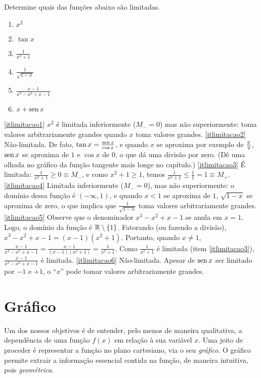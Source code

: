 \begin{exo}
Determine quais das funções abaixo são limitadas.
\begin{multicols}{3}
\begin{enumerate}
\item\label{itlimitacao1} $x^2$
 \item\label{itlimitacao2} $\tan x$
\item\label{itlimitacao3} $\frac{1}{x^2+1}$
\item\label{itlimitacao4} $\frac{1}{\sqrt{1-x}}$
\item\label{itlimitacao5} $\frac{x-1}{x^3-x^2+x-1}$
\item\label{itlimitacao6} $x+\operatorname{sen} x$
\end{enumerate}
\end{multicols}
\vspace{0.01cm}
\begin{sol}
\eqref{itlimitacao1} $x^2$ é limitada inferiormente ($M_-=0$) mas não
superiormente: toma valores arbitrariamente grandes quando
$x$ toma valores grandes. \eqref{itlimitacao2} Não-limitada. De fato, $\tan x=\frac{\operatorname{sen}
x}{\cos x}$, e quando $x$ se aproxima por exemplo de $\tfrac{\pi}{2}$, $\operatorname{sen} x$ se aproxima
de $1$ e $\cos x$ de $0$, o que dá uma divisão por zero. (Dê uma olhada no gráfico da
função tangente mais longe no capítulo.) \eqref{itlimitacao3} É limitada: 
$\tfrac{1}{x^2+1}\geq 0\equiv M_-$, e como $x^2+1\geq
1$, temos 
$\frac{1}{x^2+1}\leq \tfrac11=1\equiv M_+$. \eqref{itlimitacao4} Limitada
inferiormente ($M_-=0$), mas não superiormente: o domínio
dessa função é $(-\infty,1)$, e quando $x<1$ se aproxima de $1$, $\sqrt{1-x}$ se aproxima
de zero, o que implica que $\frac{1}{\sqrt{1-x}}$ toma valores arbitrariamente grandes.
\eqref{itlimitacao5} Observe que o denominador $x^3-x^2+x-1$ se anula em $x=1$. Logo, o
domínio da função é $\mathbb{R}\setminus \{1\}$. Fatorando (ou fazendo a divisão),
$x^3-x^2+x-1=(x-1)(x^2+1)$. Portanto, quando $x\neq 1$,
$\frac{x-1}{x^3-x^2+x-1}=\frac{x-1}{(x-1)(x^2+1)}=\frac{1}{x^2+1}$. Como $\frac{1}{x^2+1}$
é limitada (item \eqref{itlimitacao3}), $\frac{x-1}{x^3-x^2+x-1}$ é limitada.
\eqref{itlimitacao6} Não-limitada. Apesar de $\operatorname{sen} x$ ser limitado por $-1$ e $+1$, 
o ``$x$'' pode tomar valores arbitrariamente grandes.
\end{sol}
\end{exo}

\section{Gráfico}\label{Sec:Graficos}
Um dos nossos objetivos é de entender, pelo menos de maneira
qualitativa, a dependência de uma função $f(x)$ em relação à sua
variável $x$. Uma jeito de
proceder é representar a função no plano cartesiano, via o seu
\emph{gráfico}. O gráfico permite extrair 
a informação essencial contida na função, de maneira intuitiva, pois
\emph{geométrica}.\\

